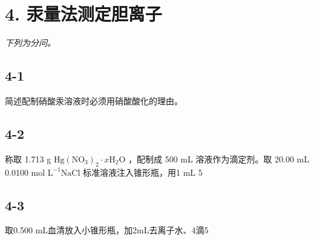 \section*{4. 汞量法测定胆离子}
\textit{下列为分问。}

\subsection*{4-1}
简述配制硝酸汞溶液时必须⽤硝酸酸化的理由。

\subsection*{4-2}
称取 1.713 g $\mathrm { H g ( N O _ { 3 } ) _ { 2 } } { \cdot } x \mathrm { H _ { 2 } O }$ ，配制成 500 mL 溶液作为滴定剂。取 20.00 mL 0.0100 mol $\mathrm { L } ^ { \mathrm { - 1 } } \mathrm { N a C l }$ 标准溶液注⼊锥形瓶，⽤1 mL 5%

\subsection*{4-3}
取0.500 mL⾎清放⼊⼩锥形瓶，加2mL去离⼦⽔、4滴5%

